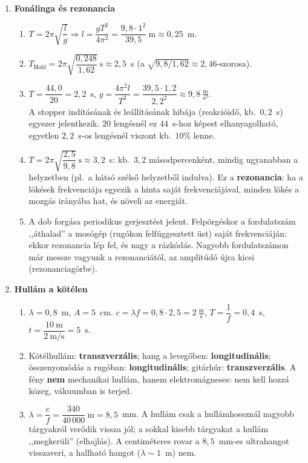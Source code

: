 \documentclass[11pt,a4paper]{article}
\begin{document}
\begin{enumerate}
\item \textbf{Fonálinga és rezonancia}
  \begin{enumerate}
    \item $T = 2\pi\sqrt{\dfrac lg} \Rightarrow l = \dfrac{gT^2}{4\pi^2} =
      \dfrac{9{,}8\cdot 1^2}{39{,}5}~\text{m} \approx 0{,}25$~m.
    \item $T_\text{Hold} = 2\pi\sqrt{\dfrac{0{,}248}{1{,}62}}~\text{s} \approx 2{,}5$~s
      (a $\sqrt{9{,}8/1{,}62} \approx 2{,}46$-szorosa).
    \item $T = \dfrac{44{,}0}{20} = 2{,}2$~s, \quad
      $g = \dfrac{4\pi^2 l}{T^2} = \dfrac{39{,}5\cdot 1{,}2}{2{,}2^2} \approx
      9{,}8~\tfrac{\text{m}}{\text{s}^2}$.\\
      A stopper indításának és leállításának hibája (reakcióidő, kb.\ $0{,}2$~s) egyszer
      jelentkezik. $20$ lengésnél ez $44$~s-hoz képest elhanyagolható, egyetlen $2{,}2$~s-os
      lengésnél viszont kb.\ $10\%$ lenne.
    \item $T = 2\pi\sqrt{\dfrac{2{,}5}{9{,}8}}~\text{s} \approx 3{,}2$~s: kb.\ $3{,}2$
      másodpercenként, mindig ugyanabban a helyzetben (pl.\ a hátsó szélső helyzetből
      indulva). Ez a \textbf{rezonancia}: ha a lökések frekvenciája egyezik a hinta saját
      frekvenciájával, minden lökés a mozgás irányába hat, és növeli az energiát.
    \item A dob forgása periodikus gerjesztést jelent. Felpörgéskor a fordulatszám
      ,,áthalad'' a mosógép (rugókon felfüggesztett üst) saját frekvenciáján: ekkor
      rezonancia lép fel, és nagy a rázkódás. Nagyobb fordulatszámon már messze vagyunk a
      rezonanciától, az amplitúdó újra kicsi (rezonanciagörbe).
  \end{enumerate}

\item \textbf{Hullám a kötélen}
  \begin{enumerate}
    \item $\lambda = 0{,}8$~m, $A = 5$~cm. $c = \lambda f = 0{,}8\cdot 2{,}5 =
      2~\tfrac{\text{m}}{\text{s}}$, \quad $T = \dfrac1f = 0{,}4$~s, \quad
      $t = \dfrac{10~\text{m}}{2~\text{m/s}} = 5$~s.
    \item Kötélhullám: \textbf{transzverzális}; hang a levegőben: \textbf{longitudinális};
      összenyomódás a rugóban: \textbf{longitudinális}; gitárhúr: \textbf{transzverzális}.
      A fény \textbf{nem} mechanikai hullám, hanem elektromágneses: nem kell hozzá közeg,
      vákuumban is terjed.
    \item $\lambda = \dfrac{c}{f} = \dfrac{340}{40\,000}~\text{m} = 8{,}5$~mm.
      A hullám csak a hullámhossznál nagyobb tárgyakról verődik vissza jól; a sokkal kisebb
      tárgyakat a hullám ,,megkerüli'' (elhajlás). A centiméteres rovar a
      $8{,}5$~mm-es ultrahangot visszaveri, a hallható hangot ($\lambda \sim 1$~m) nem.
  \end{enumerate}


\end{enumerate}
\end{document}
